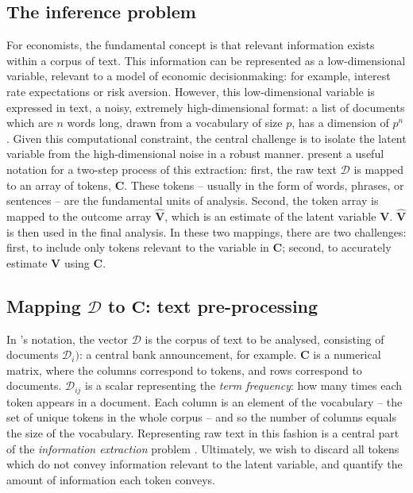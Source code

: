 \documentclass{article}
\begin{document}
\subsection{The inference problem}
For economists, the fundamental concept is that relevant information exists within a corpus of text. This information can be represented as a low-dimensional variable, relevant to a model of economic decisionmaking: for example, interest rate expectations or risk aversion. However, this low-dimensional variable is expressed in text, a noisy, extremely high-dimensional format: a list of documents which are \(n\) words long, drawn from a vocabulary of size \(p\), has a dimension of \(p^n\). Given this computational constraint, the central challenge is to isolate the latent variable from the high-dimensional noise in a robust manner.  \textcite{gentzkowTextData2019} present a useful notation for a two-step process of this extraction: first, the raw text \(\mathcal{D}\) is mapped to an array of tokens, \(\mathbf{C}\). These tokens -- usually in the form of words, phrases, or sentences -- are the fundamental units of analysis. Second, the token array is mapped to the outcome array \(\hat{\mathbf{V}} \), which is an estimate of the latent variable \(\mathbf{V}\). \(\hat{\mathbf{V}} \) is then used in the final analysis. In these two mappings, there are two challenges: first, to include only tokens relevant to the variable in \(\mathbf{C}\); second, to accurately estimate  \(\mathbf{V} \) using \(\mathbf{C}\). 

\subsection{Mapping \(\mathcal{D}\) to \(\mathbf{C}\): text pre-processing}
In \textcite{gentzkowTextData2019}'s notation, the vector \(\mathcal{D}\) is the corpus of text to be analysed, consisting of documents \(\mathcal{D}_i)\): a central bank announcement, for example. \(\mathbf{C}\) is a numerical matrix, where the columns correspond to tokens, and rows correspond to documents. \(\mathcal{D}_{ij}\) is a scalar representing the \textit{term frequency}: how many times each token appears in a document. Each column is an element of the vocabulary -- the set of unique tokens in the whole corpus -- and so the number of columns equals the size of the vocabulary. Representing raw text in this fashion is a central part of the \textit{information extraction} problem \parencite[529]{manningFoundationsStatisticalNatural1999}. Ultimately, we wish to discard all tokens which do not convey information relevant to the latent variable, and quantify the amount of information each token conveys.
\end{document}
